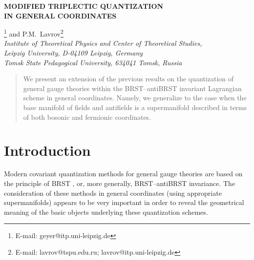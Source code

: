 \documentclass[a4paper,11pt]{article}
\begin{document}
\date{}

\begin{center}
{\Large {\bf MODIFIED TRIPLECTIC QUANTIZATION}}\\
\vspace{.2cm}
{\Large {\bf IN GENERAL COORDINATES}}
\end{center}

{\Large
\begin{center}
\coordHE{}\footnote{E-mail:
geyer@itp.uni-leipzig.de} and {\sc P.M.~Lavrov}\coordHE{}\footnote{E-mail:
lavrov@tspu.edu.ru;
lavrov@itp.uni-leipzig.de}\\

\vspace{.5cm} {\normalsize\it {}\coordHE{} Institute of Theoretical
Physics and Center of Theoretical Studies,\\ Leipzig University,
D-04109 Leipzig, Germany}\\  {\normalsize\it {}\coordHE{} Tomsk State
Pedagogical University, 634041 Tomsk, Russia}
\end{center}
}
\vspace{.5cm}

\begin{quotation}
\setlength{\baselineskip}{10pt} {\small \noindent }

{\small We present an extension of the previous results \cite{gln} on the
quantization of general gauge theories within the BRST--antiBRST invariant
Lagrangian scheme in general coordinates. Namely, we generalize \cite{gln}
to the case when the base manifold of fields and antifields is a
supermanifold described in terms of both bosonic and fermionic coordinates.
}
\end{quotation}

\section{Introduction}


Modern covariant quantization methods for general gauge theories are based
on the principle of BRST \cite{bv,brst}, or, more generally, BRST--antiBRST
\cite{BLT,3pl,anti,mod3pl} invariance. The consideration of these methods in
general coordinates (using appropriate supermanifolds) appears to be very
important in order to reveal the geometrical meaning of the basic objects
underlying these quantization schemes.
\end{document}

